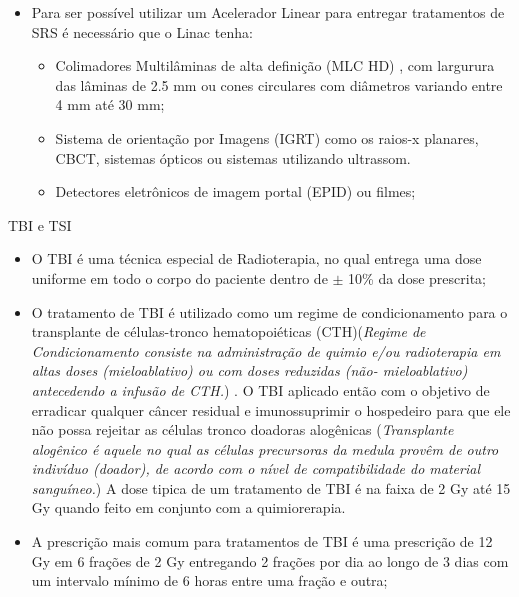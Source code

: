 \documentclass[11pt,a4paper]{article}
\newcounter{exemplo}
\begin{document}
\begin{exemplo}
\begin{itemize}
        \item Para ser possível utilizar um Acelerador Linear para entregar tratamentos de SRS é necessário que o Linac tenha:
        
            \begin{itemize}[label=\textcolor{CarnationPink}{$\blacktriangleright$}]
                \item Colimadores Multilâminas de alta definição (MLC HD) , com largurura das lâminas de 2.5 mm ou cones circulares com diâmetros variando entre 4 mm até 30 mm;
                \item Sistema de orientação por Imagens (IGRT) como os raios-x planares, CBCT, sistemas ópticos ou sistemas utilizando ultrassom.
                \item Detectores eletrônicos de imagem portal (EPID) ou filmes;
            \end{itemize}

    \end{itemize}

    \textcolor{CarnationPink}{TBI e TSI}
    \begin{itemize}
        \item O TBI é uma técnica especial de Radioterapia, no qual entrega uma dose uniforme em todo o corpo do paciente dentro de $\pm$ 10\% da dose prescrita;
        
        \item O tratamento de TBI é utilizado como um regime de condicionamento para o transplante de células-tronco hematopoiéticas (CTH)(\textit{Regime de Condicionamento consiste na administração de quimio e/ou radioterapia em altas doses (mieloablativo) ou com doses reduzidas (não- mieloablativo) antecedendo a infusão de CTH.}) . O TBI aplicado então com o objetivo de erradicar qualquer câncer residual e imunossuprimir o hospedeiro para que ele não possa rejeitar as células tronco doadoras alogênicas (\textit{Transplante alogênico é aquele no qual as células precursoras da medula provêm de outro indivíduo (doador), de acordo com o nível de compatibilidade do material sanguíneo.})  A dose tipica de  um tratamento de TBI é na faixa de 2 Gy até 15 Gy quando feito em conjunto com a quimiorerapia.
        
        \item A prescrição mais comum para tratamentos de TBI é uma prescrição de 12 Gy em 6 frações de 2 Gy entregando 2 frações por dia  ao longo de 3 dias com um intervalo mínimo de 6 horas entre uma fração e outra;
        

\end{itemize}
\end{exemplo}
\end{document}
